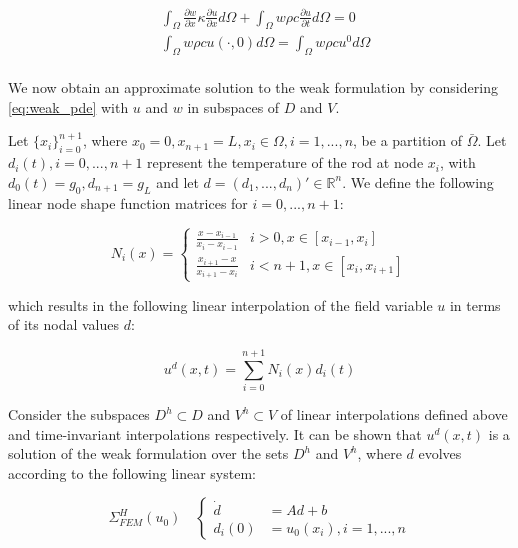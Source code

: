 \documentclass[oribibl]{llncs/llncs}
\newcommand*{\R}{\mathbb{R}}
\begin{document}
\begin{equation}\label{eq:weak_pde}
    \begin{aligned}
        &\int_{\Omega} \frac{\partial w}{\partial x} \kappa \frac{\partial
        u}{\partial x} d \Omega + 
        \int_{\Omega} w \rho c \frac{\partial u}{\partial t} d \Omega = 0 \\
        &\int_{\Omega} w \rho c u(\cdot, 0) d \Omega =
        \int_{\Omega} w \rho c u^0 d \Omega \\
    \end{aligned}
\end{equation}

We now obtain an approximate solution to the weak formulation by considering
\cref{eq:weak_pde} with $u$ and $w$ in subspaces of $D$ and $V$.

Let $\{x_i\}_{i = 0}^{n +
1}$, where $x_0 = 0, x_{n+1} = L, x_i \in \Omega, i = 1,...,n$, be a partition of
$\bar\Omega$. Let $d_i(t), i = 0,...,n+1$ represent the
temperature of the rod at node $x_i$, with $d_0(t) = g_0, d_{n+1} = g_L$ and let $d = (d_1, ..., d_n)' \in
\R^n$. We define the following linear node shape function matrices for $i =
0,...,n+1$:

\begin{equation}
    N_i(x) = \begin{cases}
        \frac{x - x_{i - 1}}{x_i - x_{i - 1}} & i > 0, x \in [x_{i-1}, x_i] \\
        \frac{x_{i+1} - x}{x_{i+1} - x_{i}} & i < n+1, x \in [x_{i}, x_{i+1}] 
    \end{cases} 
\end{equation}

which results in the following linear interpolation of the field variable $u$ in
terms of its nodal values $d$:

\begin{equation}
    u^d(x, t) = \sum_{i=0}^{n+1} N_i(x) d_i(t)
\end{equation}

Consider the subspaces $D^h \subset D$ and $V^h \subset V$ of linear
interpolations defined above and time-invariant interpolations respectively.
It can be shown that $u^d(x, t)$ is a solution of the weak formulation over the
sets $D^h$ and $V^h$, where $d$ evolves
according to the following linear system:

\begin{equation}\label{eq:fem}
    \Sigma^H_{FEM}(u_0) \quad \left \{
    \begin{aligned}
        \dot{d} &= A d + b \\
        d_i(0) &= u_0(x_i), i = 1,...,n
    \end{aligned}
    \right.
\end{equation}
\end{document}
